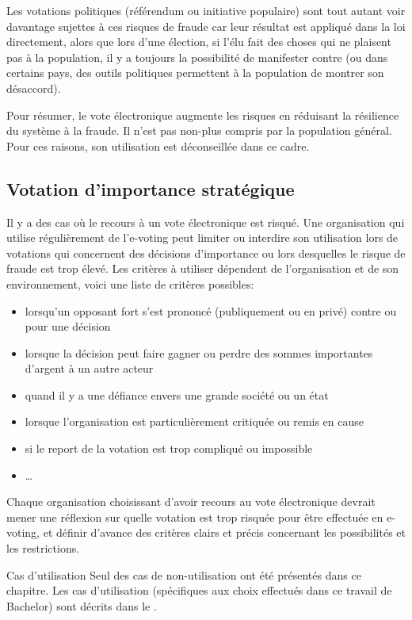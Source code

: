\documentclass[../report]{subfiles}
\begin{document}
Les votations politiques (référendum ou initiative populaire) sont tout autant voir davantage sujettes à ces risques de fraude 
car leur résultat est appliqué dans la loi directement, alors que lors d'une élection, si l'élu fait des choses qui ne
plaisent pas à la population, il y a toujours la possibilité de manifester contre (ou dans certains pays, des outils politiques
permettent à la population de montrer son désaccord).

Pour résumer, le vote électronique augmente les risques en réduisant la résilience du système à la fraude. 
Il n'est pas non-plus compris par la population général. Pour ces raisons, son utilisation est déconseillée dans ce cadre.

\subsection{Votation d'importance stratégique}

Il y a des cas où le 
recours à un vote électronique est risqué.
Une organisation qui utilise régulièrement de l'e-voting peut limiter ou interdire
son utilisation lors de votations qui concernent des décisions d'importance ou lors desquelles le risque de fraude est trop élevé.
Les critères à utiliser dépendent de l'organisation et de son environnement, voici une liste de critères possibles:
\begin{itemize}
	\item lorsqu'un opposant fort s'est prononcé (publiquement ou en privé) contre ou pour une décision
	\item lorsque la décision peut faire gagner ou perdre des sommes importantes d'argent à un autre acteur
	\item quand il y a une défiance envers une grande société ou un état
	\item lorsque l'organisation est particulièrement critiquée ou remis en cause
	\item si le report de la votation est trop compliqué ou impossible
	\item \dots
\end{itemize}

Chaque organisation choisissant d'avoir recours au vote électronique devrait mener une réflexion sur quelle
votation est trop risquée pour être effectuée en e-voting, et définir d'avance des critères clairs et précis 
concernant les possibilités et les restrictions.

\begin{nota}{Cas d'utilisation}
	Seul des cas de non-utilisation ont été présentés dans ce chapitre. Les cas d'utilisation (spécifiques 
	aux choix effectués dans ce travail de Bachelor) sont décrits dans le .
\end{nota}
\end{document}
